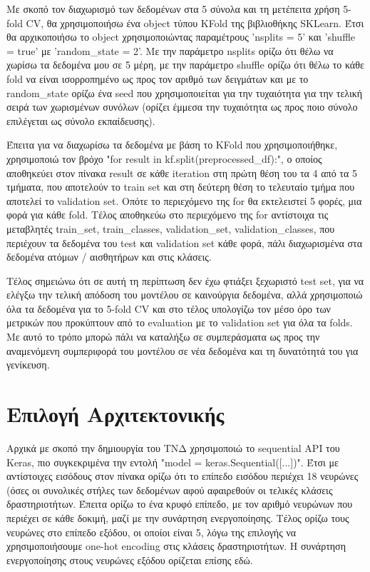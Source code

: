 \documentclass[12pt,a4paper]{article}
\begin{document}
Με σκοπό τον διαχωρισμό των δεδομένων στα 5 σύνολα και τη μετέπειτα χρήση 5-fold CV, θα χρησιμοποιήσω ένα object τύπου KFold της βιβλιοθήκης SKLearn. Έτσι θα αρχικοποιήσω το object χρησιμοποιώντας παραμέτρους 'nsplits = 5' και 'shuffle = true' με 'random\_state = 2'. Με την παράμετρο nsplits ορίζω ότι θέλω να χωρίσω τα δεδομένα μου σε 5 μέρη, με την παράμετρο shuffle ορίζω ότι θέλω το κάθε fold να είναι ισορροπημένο ως προς τον αριθμό των δειγμάτων και με το random\_state ορίζω ένα seed που χρησιμοποιείται για την τυχαιότητα για την τελική σειρά των χωρισμένων συνόλων (ορίζει έμμεσα την τυχαιότητα ως προς ποιο σύνολο επιλέγεται ως σύνολο εκπαίδευσης).

Έπειτα για να διαχωρίσω τα δεδομένα με βάση το KFold που χρησιμοποιήθηκε, χρησιμοποιώ τον βρόχο "for result in kf.split(preprocessed\_df):", ο οποίος αποθηκεύει στον πίνακα result σε κάθε iteration στη πρώτη θέση του τα 4 από τα 5 τμήματα, που αποτελούν το train set και στη δεύτερη θέση το τελευταίο τμήμα που αποτελεί το validation set. Οπότε το περιεχόμενο της for θα εκτελειστεί 5 φορές, μια φορά για κάθε fold. Τέλος αποθηκεύω στο περιεχόμενο της for αντίστοιχα τις μεταβλητές train\_set, train\_classes, validation\_set, validation\_classes, που περιέχουν τα δεδομένα του test και validation set κάθε φορά, πάλι διαχωρισμένα στα δεδομένα ατόμων / αισθητήρων και στις κλάσεις. 

Τέλος σημειώνω ότι σε αυτή τη περίπτωση δεν έχω φτιάξει ξεχωριστό test set, για να ελέγξω την τελική απόδοση του μοντέλου σε καινούργια δεδομένα, αλλά χρησιμοποιώ όλα τα δεδομένα για το 5-fold CV και στο τέλος υπολογίζω τον μέσο όρο των μετρικών που προκύπτουν από το evaluation με το validation set για όλα τα folds. Με αυτό το τρόπο μπορώ πάλι να καταλήξω σε συμπεράσματα ως προς την αναμενόμενη συμπεριφορά του μοντέλου σε νέα δεδομένα και τη δυνατότητά του για γενίκευση.

\section{Επιλογή Αρχιτεκτονικής}
\label{Επιλογή Αρχιτεκτονικής}

Αρχικά με σκοπό την δημιουργία του ΤΝΔ χρησιμοποιώ το sequential API του Keras, πιο συγκεκριμένα την εντολή "model = keras.Sequential([...])". Έτσι με αντίστοιχες εισόδους στον πίνακα ορίζω ότι το επίπεδο εισόδου περιέχει 18 νευρώνες (όσες οι συνολικές στήλες των δεδομένων αφού αφαιρεθούν οι τελικές κλάσεις δραστηριοτήτων. Έπειτα ορίζω το ένα κρυφό επίπεδο, με τον αριθμό νευρώνων που περιέχει σε κάθε δοκιμή, μαζί με την συνάρτηση ενεργοποίησης. Τέλος ορίζω τους νευρώνες στο επίπεδο εξόδου, οι οποίοι είναι 5, λόγω της επιλογής να χρησιμοποιήσουμε one-hot encoding στις κλάσεις δραστηριοτήτων. Η συνάρτηση ενεργοποίησης στους νευρώνες εξόδου ορίζεται επίσης εδώ.
\end{document}
